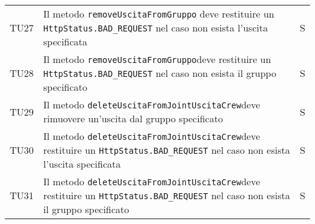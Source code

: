 \begin{center}
{\begin{longtable}{
        |>{\centering\arraybackslash}p{48pt}
        |>{\centering\arraybackslash}p{308pt}
        |>{\centering\arraybackslash}p{27pt}|}
        TU27               & Il metodo \texttt{removeUscitaFromGruppo} deve restituire un \texttt{HttpStatus.BAD\_REQUEST} nel caso non esista l'uscita specificata    & S \\
        TU28               & Il metodo \texttt{removeUscitaFromGruppo}deve restituire un \texttt{HttpStatus.BAD\_REQUEST} nel caso non esista il gruppo specificato    & S \\
        TU29               & Il metodo \texttt{deleteUscitaFromJointUscitaCrew}deve rimuovere un'uscita dal gruppo specificato    & S \\
        TU30               & Il metodo \texttt{deleteUscitaFromJointUscitaCrew}deve restituire un \texttt{HttpStatus.BAD\_REQUEST} nel caso non esista l'uscita specificata   & S \\
        TU31              & Il metodo \texttt{deleteUscitaFromJointUscitaCrew}deve restituire un \texttt{HttpStatus.BAD\_REQUEST} nel caso non esista il gruppo specificato    & S \\
        
        
        
        
      \end{longtable}
    }
  \end{center}